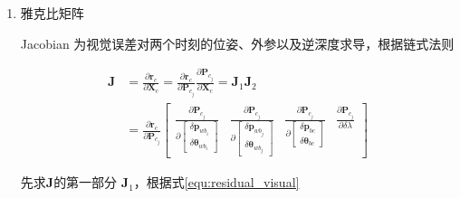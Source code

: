 \documentclass[12pt,a4paper]{article}
\begin{document}
\begin{enumerate}
固定的协方差矩阵，归一化平面的标准差为 $\frac{1.5}{f}$，即像素标准差为 $1.5$

\begin{equation}
\Sigma = 
\begin{bmatrix}
\frac{f}{1.5} & 0 \\
0 & \frac{f}{1.5}
\end{bmatrix}
\end{equation}

\begin{lstlisting}
ProjectionFactor::sqrt_info = FOCAL_LENGTH / 1.5 * Matrix2d::Identity();
\end{lstlisting}

\item 雅克比矩阵

Jacobian 为视觉误差对两个时刻的位姿、外参以及逆深度求导，根据链式法则

\begin{equation}
\begin{aligned}
\mathbf{J} 
&= 
\frac{\partial \mathbf{r}_{c}}{\partial \mathbf{X}_{c}}
=
\frac{\partial \mathbf{r}_{c}}{\partial \mathbf{P}_{c_{j}}}
\frac{\partial \mathbf{P}_{c_{j}}}{\partial \mathbf{X}_{c}}
=
\mathbf{J}_1 \mathbf{J}_2 \\
&=
\frac{\partial \mathbf{r}_{c}}{\partial \mathbf{P}_{c_{j}}}
\begin{bmatrix}
\frac{\partial \mathbf{P}_{c_{j}}}
{\partial\left[\begin{array}{c}{\delta \mathbf{p}_{w b_{i}}} \\ 
{\delta \boldsymbol{\theta}_{w b_{i}}}\end{array}\right]} 
&
\frac{\partial \mathbf{P}_{c_{j}}}
{\partial\left[\begin{array}{c}{\delta \mathbf{p}_{w b_{j}}} \\ 
{\delta \boldsymbol{\theta}_{w b_{j}}}\end{array}\right]} 
&
\frac{\partial \mathbf{P}_{c_{j}}}
{\partial\left[\begin{array}{c}{\delta \mathbf{p}_{bc}} \\ 
{\delta \boldsymbol{\theta}_{bc}}\end{array}\right]} 
&
\frac{\partial \mathbf{P}_{c_{j}}}{\partial \delta \lambda}
\end{bmatrix}
\end{aligned}
\end{equation}

先求$\mathbf{J}$的第一部分 $\mathbf{J}_1$，根据式\eqref{equ:residual_visual}


\end{enumerate}
\end{document}
